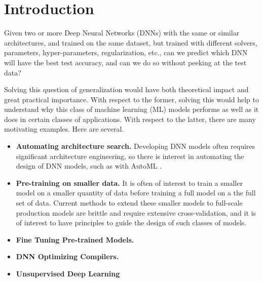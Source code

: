 
\section{Introduction}
\label{sxn:intro}

Given two or more Deep Neural Networks (DNNs) with the same or similar architectures, and trained on the same dataset, but trained with different solvers, parameters, hyper-parameters, regularization, etc., can we predict which DNN will have the best test accuracy, and can we do so without peeking at the test data?   

Solving this question of generalization would have both theoretical impact and great practical importance. 
With respect to the former, solving this would help to understand why this class of machine learning (ML) models performs as well as it does in certain classes of applications.
With respect to the latter, there are many motivating examples.
% 
Here are several.
\begin{itemize}
\item
\textbf{Automating architecture search.}
Developing DNN models often requires significant architecture engineering, so there is interest in automating the design of DNN models, such as with AutoML \cite{AutoML}.
\item
\textbf{Pre-training on smaller data.}
It is often of interest to train a smaller model on a smaller quantity of data before training a full model on a the full set of data.
Current methods to extend these smaller models to full-scale production models are brittle and require extensive cross-validation, and it is of interest to have principles to guide the design of such classes of models.
\item
\textbf{Fine Tuning Pre-trained Models.}
\item
\textbf{DNN Optimizing Compilers.}
\item
\textbf{Unsupervised Deep Learning}
\end{itemize}

